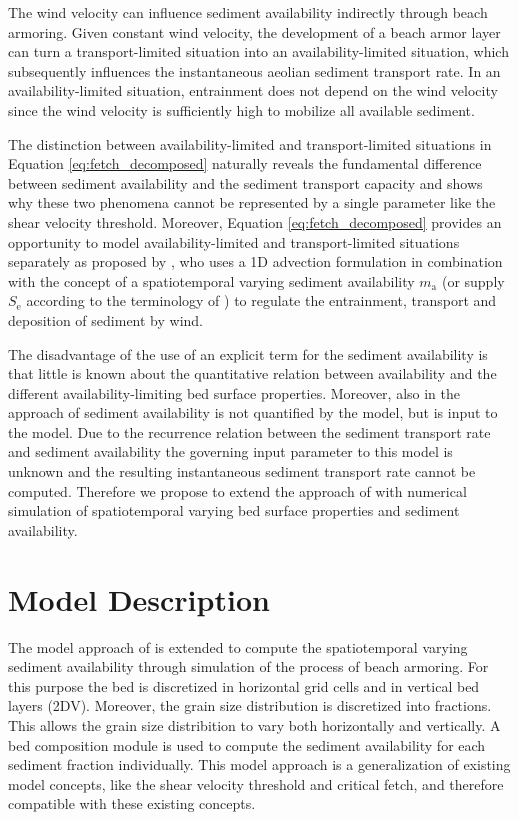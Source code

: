 \noindent The wind velocity can influence sediment availability
indirectly through beach armoring. Given constant wind velocity, the
development of a beach armor layer can turn a transport-limited
situation into an availability-limited situation, which subsequently
influences the instantaneous aeolian sediment transport rate.  In an
availability-limited situation, entrainment does not depend on the
wind velocity since the wind velocity is sufficiently high to mobilize
all available sediment.

The distinction between availability-limited and transport-limited
situations in Equation \ref{eq:fetch_decomposed} naturally reveals the
fundamental difference between sediment availability and the sediment
transport capacity and shows why these two phenomena cannot be
represented by a single parameter like the shear velocity
threshold. Moreover, Equation \ref{eq:fetch_decomposed} provides an
opportunity to model availability-limited and transport-limited
situations separately as proposed by \citet{deVries2014a}, who uses a
1D advection formulation in combination with the concept of a
spatiotemporal varying sediment availability $m_{\mathrm{a}}$ (or
supply $S_{\mathrm{e}}$ according to the terminology of
\citet{deVries2014a}) to regulate the entrainment, transport and
deposition of sediment by wind.

The disadvantage of the use of an explicit term for the sediment
availability is that little is known about the quantitative relation
between availability and the different availability-limiting bed
surface properties. Moreover, also in the approach of
\citet{deVries2014a} sediment availability is not quantified by the
model, but is input to the model. Due to the recurrence relation
between the sediment transport rate and sediment availability the
governing input parameter to this model is unknown and the resulting
instantaneous sediment transport rate cannot be computed. Therefore we
propose to extend the approach of \citet{deVries2014a} with numerical
simulation of spatiotemporal varying bed surface properties and
sediment availability.

\section{Model Description}
\label{sec:model}

The model approach of \citet{deVries2014a} is extended to compute the
spatiotemporal varying sediment availability through simulation of the
process of beach armoring. For this purpose the bed is discretized in
horizontal grid cells and in vertical bed layers (2DV). Moreover, the
grain size distribution is discretized into fractions. This allows the
grain size distribition to vary both horizontally and vertically. A
bed composition module is used to compute the sediment availability
for each sediment fraction individually. This model approach is a
generalization of existing model concepts, like the shear velocity
threshold and critical fetch, and therefore compatible with these
existing concepts.

